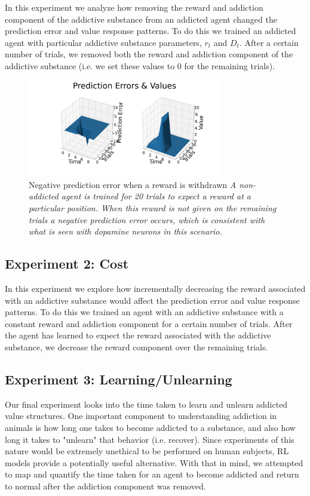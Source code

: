 \documentclass[10pt,letterpaper]{article}
\begin{document}
In this experiment we analyze how removing the reward and addiction component of the addictive substance from an addicted agent changed the prediction error and value response patterns. To do this we trained an addicted agent with particular addictive substance parameters, $r_t$ and $D_t$. After a certain number of trials, we removed both the reward and addiction component of the addictive substance (i.e. we set these values to 0 for the remaining trials).

\begin{figure}[H]
   \centering
    \includegraphics[width = 85mm]{graphs/negPE.png}
    \caption{Negative prediction error when a reward is withdrawn
    \newline \emph{A non-addicted agent is trained for 20 trials to expect a reward at a particular position. When this reward is not given on the remaining trials a negative prediction error occurs, which is consistent with what is seen with dopamine neurons in this scenario.}}
    \label{fig:Baseline}
\end{figure}


\subsection{Experiment 2: Cost}
In this experiment we explore how incrementally decreasing the reward associated with an addictive substance would affect the prediction error and value response patterns. To do this we trained an agent with an addictive substance with a constant reward and addiction component for a certain number of trials. After the agent has learned to expect the reward associated with the addictive substance, we decrease the reward component over the remaining trials. 


\subsection{Experiment 3: Learning/Unlearning}
Our final experiment looks into the time taken to learn and unlearn addicted value structures. One important component to understanding addiction in animals is how long one takes to become addicted to a substance, and also how long it takes to "unlearn" that behavior (i.e. recover). Since experiments of this nature would be extremely unethical to be performed on human subjects, RL models provide a potentially useful alternative. With that in mind, we attempted to map and quantify the time taken for an agent to become addicted and return to normal after the addiction component was removed.
\end{document}
